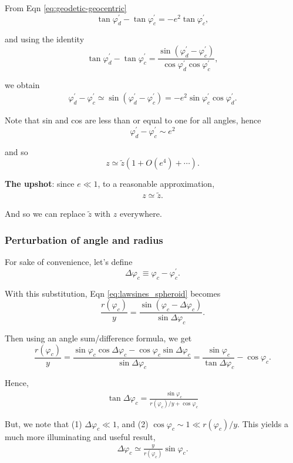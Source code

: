 \documentclass[10pt]{article}
\begin{document}
From Eqn \eqref{eq:geodetic-geocentric}
$$
\tan \varphi_d^{'} - \tan \varphi_c^{'} = - e^2 \tan \varphi_c^{'},
$$

and using the identity
$$
\tan \varphi_d^{'} - \tan \varphi_c^{'} = \frac{\sin (\varphi_d^{'}-\varphi_c^{'})}{\cos \varphi_d^{'} \cos\varphi_c^{'}},
$$

we obtain
\begin{align}
\varphi_d^{'}-\varphi_c^{'} \simeq \sin (\varphi_d^{'}-\varphi_c^{'}) = - e^2 \sin \varphi_c^{'} \cos \varphi_d^{'}.
\end{align}

Note that sin and cos are less than or equal to one for all angles, hence
$$
\varphi_d^{'}-\varphi_c^{'} \sim e^2
$$

and so
$$
z \simeq \tilde{z} (1 + O(e^4) + \cdots).
$$

\textbf{The upshot}: since $e \ll 1$, to a reasonable approximation,
\begin{align}
z \simeq \tilde{z}.
\end{align}

And so we can replace $\tilde{z}$ with $z$ everywhere.

\subsubsection{Perturbation of angle and radius}

For sake of convenience, let's define
$$
\Delta \varphi_c \equiv \varphi_c - \varphi_c^{'}.
$$

With this substitution, Eqn \eqref{eq:lawsines_spheroid} becomes
$$
\frac{r(\varphi_c)}{y} = \frac{\sin (\varphi_c - \Delta \varphi_c)}{\sin \Delta \varphi_c}.
$$ 

Then using an angle sum/difference formula, we get
$$
\frac{r(\varphi_c)}{y} = \frac{\sin \varphi_c \cos \Delta \varphi_c - \cos \varphi_c \sin \Delta \varphi_c}{\sin \Delta \varphi_c} = \frac{\sin \varphi_c}{\tan \Delta \varphi_c} - \cos \varphi_c.
$$

Hence,
\begin{align}
\tan \Delta \varphi_c = \frac{\sin \varphi_c }{r(\varphi_c) / y + \cos \varphi_c}
\end{align}

But, we note that (1) $\Delta \varphi_c \ll 1$, and (2) $\cos \varphi_c \sim 1 \ll r(\varphi_c) / y$. This yields a much more illuminating and useful result,
\begin{align} \label{eq:dphi}
\Delta \varphi_c \simeq \frac{y }{r(\varphi_c)} \sin \varphi_c.
\end{align}
\end{document}
